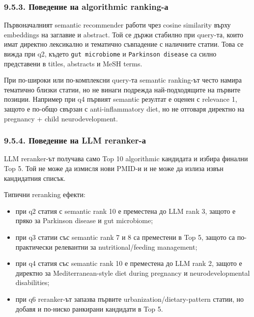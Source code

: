\documentclass[12pt,a4paper]{article}
\providecommand{\tightlist}{\setlength{\itemsep}{0pt}\setlength{\parskip}{0pt}}
\begin{document}
\subsubsection{9.5.3. Поведение на algorithmic ranking-а}\label{ux43fux43eux432ux435ux434ux435ux43dux438ux435-ux43dux430-algorithmic-ranking-ux430}

Първоначалният semantic recommender работи чрез cosine similarity върху embeddings на заглавие и abstract. Той се държи стабилно при query-та, които имат директно лексикално и тематично съвпадение с наличните статии. Това се вижда при q2, където \texttt{gut\ microbiome} и \texttt{Parkinson\ disease} са силно представени в titles, abstracts и MeSH terms.

При по-широки или по-комплексни query-та semantic ranking-ът често намира тематично близки статии, но не винаги подрежда най-подходящите на първите позиции. Например при q4 първият semantic резултат е оценен с relevance 1, защото е по-общо свързан с anti-inflammatory diet, но не отговаря директно на pregnancy + child neurodevelopment.

\subsubsection{9.5.4. Поведение на LLM reranker-а}\label{ux43fux43eux432ux435ux434ux435ux43dux438ux435-ux43dux430-llm-reranker-ux430}

LLM reranker-ът получава само Top 10 algorithmic кандидата и избира финални Top 5. Той не може да измисля нови PMID-и и не може да излиза извън кандидатния списък.

Типични reranking ефекти:

\begin{itemize}
\tightlist
\item
  при q2 статия с semantic rank 10 е преместена до LLM rank 3, защото е пряко за Parkinson disease и gut microbiome;
\item
  при q3 статии със semantic rank 7 и 8 са преместени в Top 5, защото са по-практически релевантни за nutritional/feeding management;
\item
  при q4 статия със semantic rank 10 е преместена до LLM rank 2, защото е директно за Mediterranean-style diet during pregnancy и neurodevelopmental disabilities;
\item
  при q6 reranker-ът запазва първите urbanization/dietary-pattern статии, но добавя и по-ниско ранкирани кандидати в Top 5.
\end{itemize}
\end{document}

